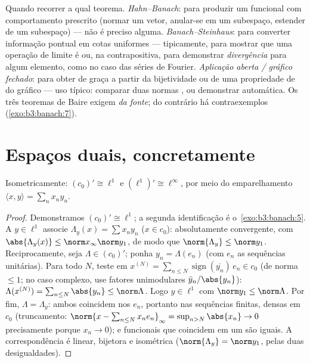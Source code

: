 \begin{method}\label{met:b3:banach:trilogy}
Quando recorrer a qual teorema. \emph{Hahn--Banach}: para produzir um
funcional com comportamento prescrito (normar um vetor, anular-se em um
subespaço, estender de um subespaço) --- não é preciso 
alguma. \emph{Banach--Steinhaus}: para converter informação pontual em
cotas uniformes --- tipicamente, para mostrar que uma operação de
limite é  ou, na contrapositiva, para demonstrar
\emph{divergência} para algum elemento, como no caso das séries de
Fourier. \emph{Aplicação aberta / gráfico fechado}: para obter
 de graça a partir da bijetividade  ou de uma
propriedade de  do gráfico --- uso típico: comparar duas normas
, ou demonstrar  automática. Os três teoremas de
Baire exigem  \emph{da fonte}; do contrário há contraexemplos
(\cref{exo:b3:banach:7}).
\end{method}

\section{Espaços duais, concretamente}

\begin{theorem}\label{thm:b3:banach:duals}
Isometricamente: $(c_0)' \cong \ell^1$ e $(\ell^1)' \cong
\ell^\infty$, por meio do emparelhamento
$\langle x, y\rangle = \sum_n
x_ny_n$.
\end{theorem}

\begin{proof}
Demonstramos $(c_0)' \cong \ell^1$; a segunda identificação é o~\cref{exo:b3:banach:5}. A $y \in \ell^1$
associe $\Lambda_y(x)
= \sum x_ny_n$ ($x \in c_0$): absolutamente convergente, com $\abs{\Lambda_y(x)} \leq \norm x_\infty\norm y_1$, de modo que
$\norm{\Lambda_y} \leq \norm y_1$. Reciprocamente, seja $\Lambda \in
(c_0)'$; ponha $y_n = \Lambda(e_n)$ (com $e_n$ as
sequências unitárias). Para todo $N$, teste em $x^{(N)} = \sum_{n \leq N}
\operatorname{sign}(\overline{y_n})\,e_n \in c_0$ (de norma
$\leq
1$; no caso complexo, use fatores unimodulares $\bar y_n/\abs
{y_n}$): $\Lambda(x^{(N)}) = \sum_{n\leq N}\abs{y_n} \leq
\norm\Lambda$.
Logo $y \in \ell^1$ com $\norm y_1 \leq
\norm\Lambda$. Por fim, $\Lambda = \Lambda_y$: ambos coincidem nos $e_n$,
portanto nas sequências finitas, densas em $c_0$ (truncamento:
$\norm{x - \sum_{n \leq N}x_ne_n}_\infty = \sup_{n > N}\abs{x_n}
\to 0$ precisamente porque $x_n \to 0$); e funcionais  que coincidem
em um  são iguais. A correspondência é linear, bijetora e
isométrica ($\norm{\Lambda_y} = \norm y_1$, pelas duas desigualdades).
\end{proof}

